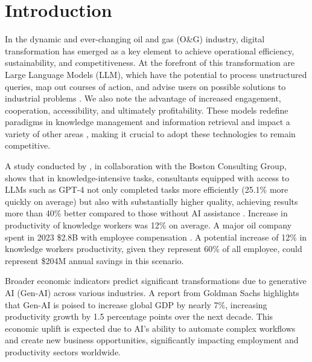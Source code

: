 
\chapter{Introduction}




    In the dynamic and ever-changing oil and gas (O\&G) industry,
    digital transformation has emerged as a key element to achieve operational efficiency, sustainability, and competitiveness. 
    At the forefront of this transformation are Large Language Models (LLM), which have the potential to process unstructured queries, map out courses of action, and advise users on possible solutions to industrial problems \citep{Kar2023}. 
    We also note the advantage of increased engagement, cooperation, accessibility, and ultimately profitability. 
    These models redefine paradigms in knowledge management and information retrieval and impact a variety of other areas \citep{Eckroth2023}, making it crucial to adopt these technologies to remain competitive.    
    
    A study conducted by \citet{Dellacqua2023}, in collaboration with the Boston Consulting Group, shows that in knowledge-intensive tasks, consultants equipped with access to LLMs such as GPT-4 not only completed tasks more efficiently (25.1\% more quickly on average) but also with substantially higher quality, achieving results more than 40\% better compared to those without AI assistance \citep{Dellacqua2023}.
    Increase in productivity of knowledge workers was 12\% on average.    
    A major oil company spent in 2023 \$2.8B with employee compensation \citep{Petrobras2024}.
    A potential increase of 12\% in knowledge workers productivity, given they represent 60\% of all employee, could represent \$204M annual savings in this scenario. 

    
    Broader economic indicators predict significant transformations due to generative AI (Gen-AI) across various industries.
    A report from Goldman Sachs \citep{Hatzius2023} highlights that Gen-AI is poised to increase global GDP by nearly 7\%, increasing productivity growth by 1.5 percentage points over the next decade. 
    This economic uplift is expected due to AI's ability to automate complex workflows and create new business opportunities, significantly impacting employment and productivity sectors worldwide.


